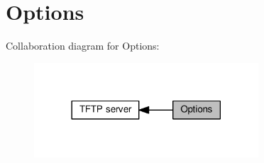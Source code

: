 \hypertarget{group__tftp__opts}{}\section{Options}
\label{group__tftp__opts}
Collaboration diagram for Options\+:
\nopagebreak
\begin{figure}[H]
\begin{center}
\leavevmode
\includegraphics[width=237pt]{group__tftp__opts}
\end{center}
\end{figure}
